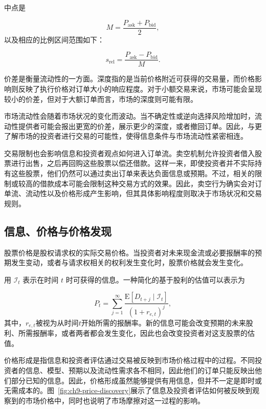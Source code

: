 中点是

\begin{equation*}
M=\frac{P_{\mathrm{ask}}+P_{\mathrm{bid}}}{2},
\label{eq:ch9-midquote}
\end{equation*}
以及相应的比例区间范围如下：

\begin{equation*}
s_{\mathrm{rel}}
=
\frac{P_{\mathrm{ask}}-P_{\mathrm{bid}}}{M}.
\label{eq:ch9-relative-spread}
\end{equation*}

价差是衡量流动性的一方面。深度指的是当前价格附近可获得的交易量，而价格影响则反映了执行价格对订单大小的响应程度。对于小额交易来说，市场可能会呈现较小的价差，但对于大额订单而言，市场的深度则可能有限。

市场流动性会随着市场状况的变化而波动。当不确定性或逆向选择风险增加时，流动性提供者可能会报出更宽的价差，展示更少的深度，或者撤回订单。因此，与更了解市场的投资者进行交易的可能性，使得信息条件与市场流动性紧密相连。

交易限制也会影响信息和投资者观点如何进入订单流。卖空机制允许投资者借入股票进行出售，之后再回购这些股票以偿还借款。这样一来，即使投资者并不实际持有这些股票，他们仍然可以通过卖出订单来表达负面信息或预期。不过，相关的限制或较高的借款成本可能会限制这种交易方式的效果。因此，卖空行为确实会对订单流、流动性以及价格形成产生影响，但其具体影响程度则取决于市场状况和交易规则。

\subsection{信息、价格与价格发现}

股票价格是股权请求权的实际交易价格。当投资者对未来现金流或必要报酬率的预期发生变动，或者与请求权相关的权利发生变化时，股票价格就会发生变化。

用 \(\mathcal{I}_t\) 表示在时间 \(t\) 时可获得的信息。一种简化的基于股利的估值可以表示为

\begin{equation}
P_t
=
\sum_{j=1}^{\infty}
\frac{\mathrm{E}[D_{t+j}\mid\mathcal{I}_t]}
{(1+r_{e,t})^j},
\label{eq:ch9-information-price}
\end{equation}
其中，\(r_{e,t}\)被视为从时间\(t\)开始所需的报酬率。新的信息可能会改变预期的未来股利、所需报酬率，或者两者都会发生变化，因此也会改变投资者对这支股票的估值。

价格形成是指信息和投资者评估通过交易被反映到市场价格过程中的过程。不同投资者的信息、模型、预期以及流动性需求各不相同，因此他们的订单只能反映出他们部分已知的信息。因此，价格形成虽然能够提供有用信息，但并不一定是即时或无需成本的。图~\ref{fig:ch9-price-discovery}展示了信息及投资者评估如何被反映到观察到的市场价格中，同时也说明了市场摩擦对这一过程的影响。


